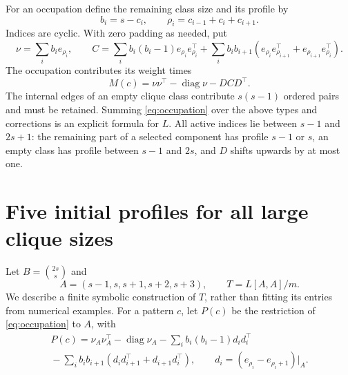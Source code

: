 \documentclass[11pt]{article}
\theoremstyle{remark}\newtheorem{remark}[theorem]{Remark}
\DeclareMathOperator{\diag}{diag}
\begin{document}
For an occupation define the remaining class size and its profile by
\[
 b_i=s-c_i,\qquad \rho_i=c_{i-1}+c_i+c_{i+1}.
\]
Indices are cyclic. With zero padding as needed, put
\[
 \nu=\sum_i b_i e_{\rho_i},\qquad
 C=\sum_i b_i(b_i-1)e_{\rho_i}e_{\rho_i}^{\top}
 +\sum_i b_i b_{i+1}
 (e_{\rho_i}e_{\rho_{i+1}}^\top+e_{\rho_{i+1}}e_{\rho_i}^\top).
\]
The occupation contributes its weight times
\begin{equation}
 M(c)=\nu\nu^\top-\diag\nu- DCD^\top.                  \label{eq:occupation}
\end{equation}
The internal edges of an empty clique class contribute
$s(s-1)$ ordered pairs and must be retained.
Summing \eqref{eq:occupation} over the above types and corrections
is an explicit formula for $L$.
All active indices lie between $s-1$ and $2s+1$:
the remaining part of a selected component has profile $s-1$ or
$s$, an empty class has profile between $s-1$ and $2s$, and
$D$ shifts upwards by at most one.

\section{Five initial profiles for all large clique sizes}
Let $B=\binom{2s}{s}$ and
\[
 A=(s-1,s,s+1,s+2,s+3),\qquad
 T=L[A,A]/m.
\]
We describe a finite symbolic construction of $T$, rather than
fitting its entries from numerical examples.
For a pattern $c$, let $P(c)$ be the restriction of
\eqref{eq:occupation} to $A$, with
\begin{equation}
\begin{split}
 P(c)=\nu_A\nu_A^\top-\diag\nu_A
 -\sum_i b_i(b_i-1)d_i d_i^\top
 \\{}-\sum_i b_i b_{i+1}(d_i d_{i+1}^\top+d_{i+1}d_i^\top),
 \qquad d_i=(e_{\rho_i}-e_{\rho_i+1})|_A.
\end{split}                                           \label{eq:P}
\end{equation}
\end{document}
